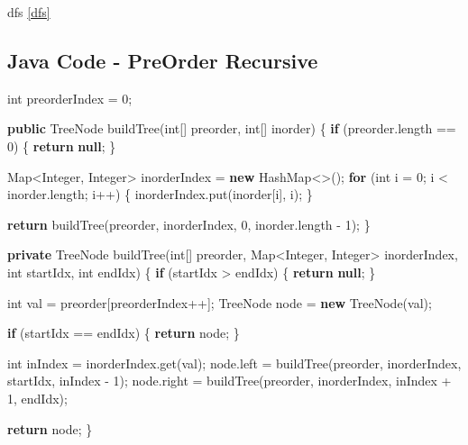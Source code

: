 \documentclass[]{book}
\newenvironment{Shaded}{\begin{snugshade}}{\end{snugshade}}
\newcommand{\BuiltInTok}[1]{#1}
\newcommand{\DataTypeTok}[1]{\textcolor[rgb]{0.13,0.29,0.53}{#1}}
\newcommand{\DecValTok}[1]{\textcolor[rgb]{0.00,0.00,0.81}{#1}}
\newcommand{\FunctionTok}[1]{\textcolor[rgb]{0.00,0.00,0.00}{#1}}
\newcommand{\KeywordTok}[1]{\textcolor[rgb]{0.13,0.29,0.53}{\textbf{#1}}}
\newcommand{\NormalTok}[1]{#1}
\begin{document}
dfs \ref{dfs}

\hypertarget{java-code---preorder-recursive-1}{%
\subsection{Java Code - PreOrder Recursive}\label{java-code---preorder-recursive-1}}

\begin{Shaded}
\begin{Highlighting}[]
\DataTypeTok{int}\NormalTok{ preorderIndex = }\DecValTok{0}\NormalTok{;}

\KeywordTok{public} \BuiltInTok{TreeNode} \FunctionTok{buildTree}\NormalTok{(}\DataTypeTok{int}\NormalTok{[] preorder, }\DataTypeTok{int}\NormalTok{[] inorder) \{}
    \KeywordTok{if}\NormalTok{ (preorder.}\FunctionTok{length}\NormalTok{ == }\DecValTok{0}\NormalTok{) \{}
        \KeywordTok{return} \KeywordTok{null}\NormalTok{;}
\NormalTok{    \}}

    \BuiltInTok{Map}\NormalTok{<}\BuiltInTok{Integer}\NormalTok{, }\BuiltInTok{Integer}\NormalTok{> inorderIndex = }\KeywordTok{new} \BuiltInTok{HashMap}\NormalTok{<>();}
    \KeywordTok{for}\NormalTok{ (}\DataTypeTok{int}\NormalTok{ i = }\DecValTok{0}\NormalTok{; i < inorder.}\FunctionTok{length}\NormalTok{; i++) \{}
\NormalTok{        inorderIndex.}\FunctionTok{put}\NormalTok{(inorder[i], i);}
\NormalTok{    \}}

    \KeywordTok{return} \FunctionTok{buildTree}\NormalTok{(preorder, inorderIndex, }\DecValTok{0}\NormalTok{, inorder.}\FunctionTok{length}\NormalTok{ - }\DecValTok{1}\NormalTok{);}
\NormalTok{\}}

\KeywordTok{private} \BuiltInTok{TreeNode} \FunctionTok{buildTree}\NormalTok{(}\DataTypeTok{int}\NormalTok{[] preorder, }\BuiltInTok{Map}\NormalTok{<}\BuiltInTok{Integer}\NormalTok{, }\BuiltInTok{Integer}\NormalTok{> inorderIndex, }\DataTypeTok{int}\NormalTok{ startIdx, }\DataTypeTok{int}\NormalTok{ endIdx) \{}
    \KeywordTok{if}\NormalTok{ (startIdx > endIdx) \{}
        \KeywordTok{return} \KeywordTok{null}\NormalTok{;}
\NormalTok{    \}}

    \DataTypeTok{int}\NormalTok{ val = preorder[preorderIndex++];}
    \BuiltInTok{TreeNode}\NormalTok{ node = }\KeywordTok{new} \BuiltInTok{TreeNode}\NormalTok{(val);}

    \KeywordTok{if}\NormalTok{ (startIdx == endIdx) \{}
        \KeywordTok{return}\NormalTok{ node;}
\NormalTok{    \}}

    \DataTypeTok{int}\NormalTok{ inIndex = inorderIndex.}\FunctionTok{get}\NormalTok{(val);}
\NormalTok{    node.}\FunctionTok{left}\NormalTok{ = }\FunctionTok{buildTree}\NormalTok{(preorder, inorderIndex, startIdx, inIndex - }\DecValTok{1}\NormalTok{);}
\NormalTok{    node.}\FunctionTok{right}\NormalTok{ = }\FunctionTok{buildTree}\NormalTok{(preorder, inorderIndex, inIndex + }\DecValTok{1}\NormalTok{, endIdx);}

    \KeywordTok{return}\NormalTok{ node;}
\NormalTok{\}}
\end{Highlighting}
\end{Shaded}
\end{document}
